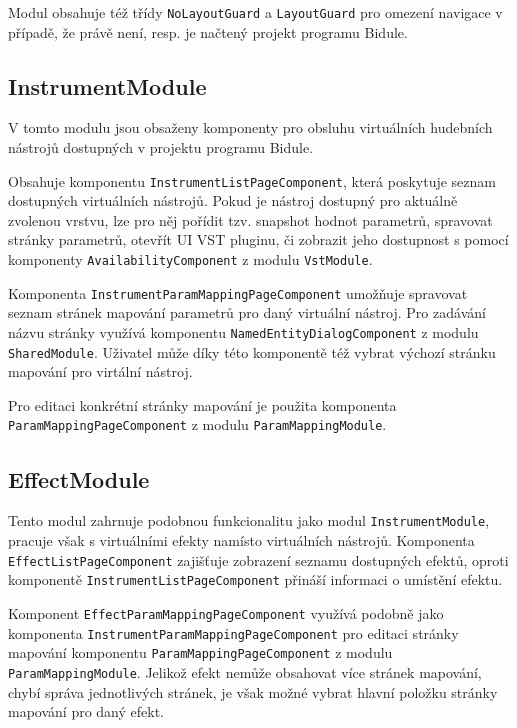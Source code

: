\documentclass[thesis=M,czech]{FITthesis}[2019/03/06]
\begin{document}
			Modul obsahuje též třídy \texttt{NoLayoutGuard} a \texttt{LayoutGuard} pro omezení navigace v případě, že právě není, resp. je načtený projekt programu Bidule.
			
		\subsection{InstrumentModule}
			V tomto modulu jsou obsaženy komponenty pro obsluhu virtuálních hudebních nástrojů dostupných v projektu programu Bidule.			

			Obsahuje komponentu \texttt{Instrument\-List\-Page\-Component}, která poskytuje seznam dostupných virtuálních nástrojů.
			Pokud je nástroj dostupný pro aktuálně zvolenou vrstvu, lze pro něj pořídit tzv. snapshot hodnot parametrů, spravovat stránky parametrů, otevřít UI VST pluginu,
			či zobrazit jeho dostupnost s pomocí komponenty \texttt{Availability\-Component} z modulu \texttt{VstModule}.
			
			Komponenta \texttt{Instrument\-Param\-Mapping\-Page\-Component} umožňuje spravovat seznam stránek mapování parametrů pro daný virtuální nástroj.
			Pro zadávání názvu stránky využívá komponentu \texttt{Named\-Entity\-Dialog\-Component} z modulu \texttt{SharedModule}.
			Uživatel může díky této komponentě též vybrat výchozí stránku mapování pro virtální nástroj.
			
			Pro editaci konkrétní stránky mapování je použita komponenta \texttt{Param\-Mapping\-Page\-Component} z modulu \texttt{Param\-Mapping\-Module}.
		
		\subsection{EffectModule}
			Tento modul zahrnuje podobnou funkcionalitu jako modul \texttt{Instrument\-Module}, pracuje však s virtuálními efekty namísto virtuálních nástrojů.
			Komponenta \texttt{Effect\-List\-Page\-Component} zajišťuje zobrazení seznamu dostupných efektů, oproti komponentě \texttt{Instrument\-List\-Page\-Component} přináší informaci o umístění efektu.
			
			Komponent \texttt{Effect\-Param\-Mapping\-Page\-Component} využívá podobně jako komponenta \texttt{Instrument\-ParamMapping\-Page\-Component} pro editaci stránky mapování komponentu \texttt{ParamMapping\-Page\-Component} z modulu \texttt{Param\-Mapping\-Module}. Jelikož efekt nemůže obsahovat více stránek mapování, chybí správa jednotlivých stránek, je však možné vybrat hlavní položku stránky mapování pro daný efekt.
\end{document}
